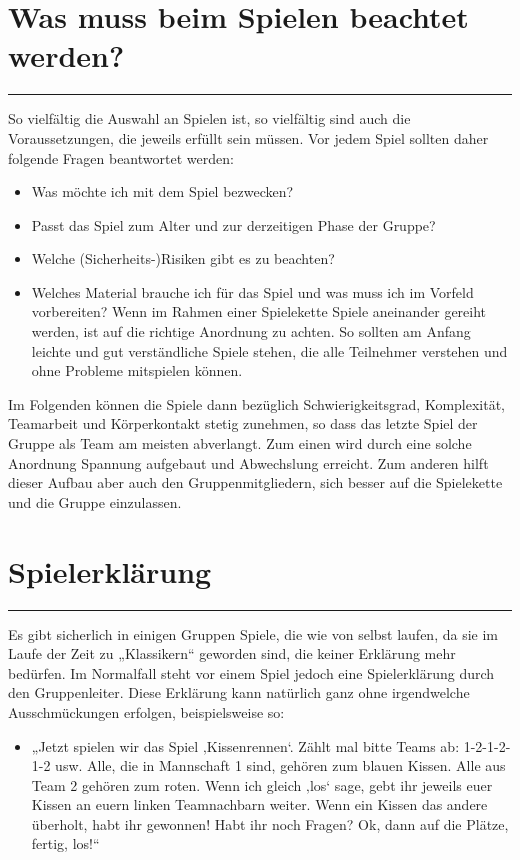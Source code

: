 \section*{Was muss beim Spielen beachtet werden? }
\par\noindent\rule{\textwidth}{0.4pt} \newline \newline
So vielfältig die Auswahl an Spielen ist, so vielfältig sind auch die Voraussetzungen, die jeweils 
erfüllt sein müssen. Vor jedem Spiel sollten daher folgende Fragen beantwortet werden:
\begin{itemize}
    \item Was möchte ich mit dem Spiel bezwecken?
    \item Passt das Spiel zum Alter und zur derzeitigen Phase der Gruppe?
    \item Welche (Sicherheits-)Risiken gibt es zu beachten?
    \item Welches Material brauche ich für das Spiel und was muss ich im Vorfeld vorbereiten? Wenn im Rahmen einer Spielekette Spiele aneinander gereiht werden, ist auf die richtige Anordnung zu achten. So sollten am Anfang leichte und gut verständliche Spiele stehen, die alle Teilnehmer verstehen und ohne Probleme mitspielen können. 
\end{itemize}
Im Folgenden können die Spiele dann bezüglich Schwierigkeitsgrad, Komplexität, Teamarbeit und 
Körperkontakt stetig zunehmen, so dass das letzte Spiel der Gruppe als Team am meisten 
abverlangt. Zum einen wird durch eine solche Anordnung Spannung aufgebaut und Abwechslung 
erreicht. Zum anderen hilft dieser Aufbau aber auch den Gruppenmitgliedern, sich besser auf die 
Spielekette und die Gruppe einzulassen.
\section*{Spielerklärung}
\par\noindent\rule{\textwidth}{0.4pt} \newline \newline
Es gibt sicherlich in einigen Gruppen Spiele, die wie von selbst laufen, da sie im Laufe der Zeit zu 
„Klassikern“ geworden sind, die keiner Erklärung mehr bedürfen. Im Normalfall steht vor einem 
Spiel jedoch eine Spielerklärung durch den Gruppenleiter. 
Diese Erklärung kann natürlich ganz ohne irgendwelche Ausschmückungen erfolgen, 
beispielsweise so:
\begin{itemize}
    \item[]„Jetzt spielen wir das Spiel ‚Kissenrennen‘. Zählt mal bitte Teams ab: 1-2-1-2-1-2 usw. Alle, die in Mannschaft 1 sind, gehören zum blauen Kissen. Alle aus Team 2 gehören zum roten. Wenn ich gleich ‚los‘ sage, gebt ihr jeweils euer Kissen an euern linken Teamnachbarn weiter. Wenn ein Kissen das andere überholt, habt ihr gewonnen! Habt ihr noch Fragen? Ok, dann auf die Plätze, fertig, los!“
\end{itemize}
    

